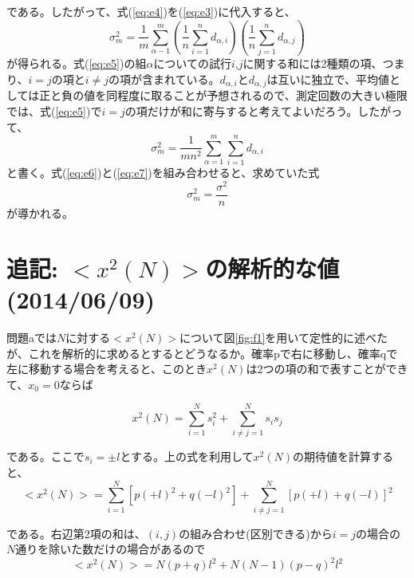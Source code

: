 \documentclass{jsarticle}
\begin{document}
        である。したがって、式(\ref{eq:e4})を(\ref{eq:e3})に代入すると、
        \begin{equation}       
        \sigma_{m}^{2} = \frac{1}{m}\sum_{\alpha - 1}^{m}\left( \frac{1}{n}\sum_{i=1}^{n}d_{\alpha, i}\right) \left( \frac{1}{n}\sum_{j = 1}^{n}d_{\alpha, j} \right)
        \label{eq:e5}
        \end{equation}
        が得られる。式(\ref{eq:e5})の組$\alpha$についての試行$i$,$j$に関する和には2種類の項、つまり、$i=j$の項と$i\neq j$の項が含まれている。$d_{\alpha, i}$と$d_{\alpha, j}$は互いに独立で、平均値としては正と負の値を同程度に取ることが予想されるので、測定回数の大きい極限では、式(\ref{eq:e5})で$i=j$の項だけが和に寄与すると考えてよいだろう。したがって、
        \begin{equation}        
            \sigma_{m}^{2} = \frac{1}{mn^{2}}\sum_{\alpha=1}^{m}\sum_{i = 1}^{n}d_{\alpha, i}
            \label{eq:e6}
        \end{equation}
        と書く。式(\ref{eq:e6})と(\ref{eq:e7})を組み合わせると、求めていた式
        \begin{equation}        
        \sigma_{m}^{2} = \frac{\sigma^{2}}{n}
        \end{equation}
        が導かれる。

    \section{追記: $<x^{2}(N)>$の解析的な値 (2014/06/09)}
    問題aでは$N$に対する$<x^{2}(N)>$について図\ref{fig:f1}を用いて定性的に述べたが、これを解析的に求めるとするとどうなるか。確率pで右に移動し、確率qで左に移動する場合を考えると、このとき$x^{2}(N)$は2つの項の和で表すことができて、$x_{0}=0$ならば
        
        \begin{equation}
            x^{2}(N) = \sum_{i=1}^{N}s_{i}^{2} + \sum_{i\neq j=1}^{N}s_{i}s_{j}
        \end{equation}
        
        である。ここで$s_{i} = \pm l$とする。上の式を利用して$x^{2}(N)$の期待値を計算すると、
        \begin{equation}
            <x^{2}(N)> = \sum_{i=1}^{N}\left[ p(+l)^{2}+q(-l)^{2} \right]  + \sum_{i\neq j=1}^{N}\left[ p(+l)+q(-l) \right]^{2}
        \end{equation}
        
        である。右辺第2項の和は、$(i,j)$の組み合わせ(区別できる)から$i=j$の場合の$N$通りを除いた数だけの場合があるので
        \begin{equation}
            <x^{2}(N)> = N(p+q)l^{2} + N(N-1)(p-q)^{2}l^{2}
        \end{equation}
        
\end{document}
